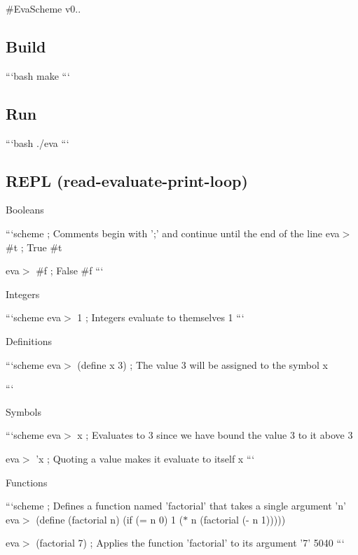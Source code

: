 \#\-Eva\-Scheme v0..

\subsection*{Build}

```bash make ```

\subsection*{Run}

```bash ./eva ```

\subsection*{R\-E\-P\-L (read-\/evaluate-\/print-\/loop)}

Booleans

```scheme ; Comments begin with ';' and continue until the end of the line eva$>$ \#t ; True \#t

eva$>$ \#f ; False \#f ```

Integers

```scheme eva$>$ 1 ; Integers evaluate to themselves 1 ```

Definitions

```scheme eva$>$ (define x 3) ; The value 3 will be assigned to the symbol x

```

Symbols

```scheme eva$>$ x ; Evaluates to 3 since we have bound the value 3 to it above 3

eva$>$ 'x ; Quoting a value makes it evaluate to itself x ```

Functions

```scheme ; Defines a function named 'factorial' that takes a single argument 'n' eva$>$ (define (factorial n) (if (= n 0) 1 ($\ast$ n (factorial (-\/ n 1)))))

eva$>$ (factorial 7) ; Applies the function 'factorial' to its argument '7' 5040 ``` 